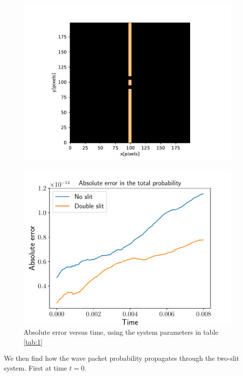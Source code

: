 \documentclass[english,notitlepage,reprint,nofootinbib]{revtex4-2}  %
\begin{document}
	\begin{figure}[H]
		\centering
		\includegraphics[scale=0.55]{figures/double_slit.pdf}
		\caption{}
		\label{fig:prob7_error}
	\end{figure}



	\begin{figure}[H]
		\centering
		\includegraphics[scale=0.55]{figures/problem7_error.pdf}
		\caption{Absolute error versus time, using the system parameters in table \ref{tab:1}}
		\label{fig:prob7_error}
	\end{figure}
	We then find how the wave packet probability propagates through the two-slit system. First at time $t=0$.
\end{document}
